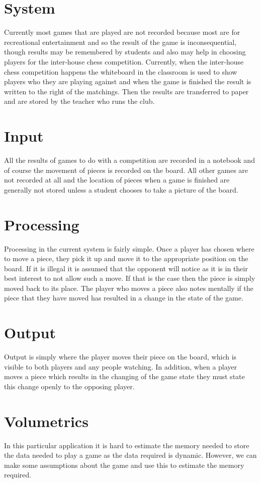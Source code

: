 \documentclass[twoside, 12pt]{report}
\begin{document}
\section{System}
Currently most games that are played are not recorded because most are for recreational entertainment and so the result of the game is inconsequential, though results may be remembered by students and also may help in choosing players for the inter-house chess competition. Currently, when the inter-house chess competition happens the whiteboard in the classroom is used to show players who they are playing against and when the game is finished the result is written to the right of the matchings. Then the results are transferred to paper and are stored by the teacher who runs the club.
\section{Input}
All the results of games to do with a competition are recorded in a notebook and of course the movement of pieces is recorded on the board. All other games are not recorded at all and the location of pieces when a game is finished are generally not stored unless a student chooses to take a picture of the board.
\section{Processing}
Processing in the current system is fairly simple. Once a player has chosen where to move a piece, they pick it up and move it to the appropriate position on the board. If it is illegal it is assumed that the opponent will notice as it is in their best interest to not allow such a move. If that is the case then the piece is simply moved back to its place. The player who moves a piece also notes mentally if the piece that they have moved has resulted in a change in the state of the game.
\section{Output}
Output is simply where the player moves their piece on the board, which is visible to both players and any people watching. In addition, when a player moves a piece which results in the changing of the game state they must state this change openly to the opposing player.
\section{Volumetrics}
In this particular application it is hard to estimate the memory needed to store the data needed to play a game as the data required is dynamic. However, we can make some assumptions about the game and use this to estimate the memory required. 
\end{document}
